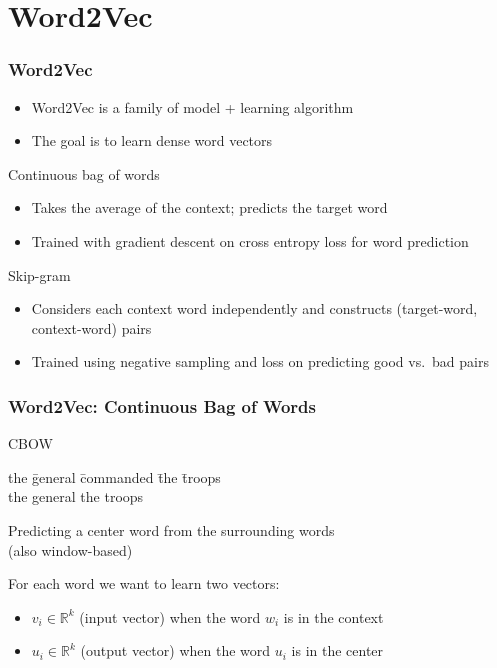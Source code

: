 \section{Word2Vec}
\frame{\tableofcontents[currentsection]}

\begin{frame}
\frametitle{Word2Vec}
\begin{itemize}[<+->]
	\item Word2Vec is a family of model + learning algorithm
	\item The goal is to learn dense word vectors
\end{itemize}
\pause
\begin{alertblock}{Continuous bag of words}
	\begin{itemize}[<+->]
		\item Takes the average of the context; predicts the target word
		\item Trained with gradient descent on cross entropy loss for word prediction 
	\end{itemize}
\end{alertblock}
\pause
\begin{alertblock}{Skip-gram}
	\begin{itemize}[<+->]
		\item Considers each context word independently and constructs (target-word, context-word) pairs
		\item Trained using negative sampling and loss on predicting good vs.\ bad pairs
	\end{itemize}
\end{alertblock}
\end{frame}

\begin{frame}
\frametitle{Word2Vec: Continuous Bag of Words}
\begin{alertblock}{CBOW}
\begin{tabbing}
the \= general \= commanded \= the \= troops\kill \\
the \> general \> \rlap{\underline{\hphantom{commanded}}} \> the \> troops
\end{tabbing}
Predicting a center word from the surrounding words \\
(also window-based)
\end{alertblock}
\pause 
\begin{block}{For each word we want to learn two vectors:}
\begin{itemize}
	\item $v_i \in \mathbb{R}^k$ (input vector) when the word $w_i$ is in the context
	\item $u_i \in \mathbb{R}^k$ (output vector) when the word $u_i$ is in the center 
\end{itemize}
\end{block}
\end{frame}

